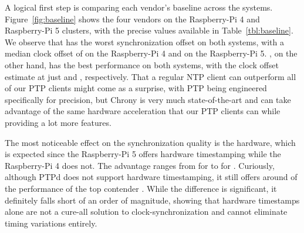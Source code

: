 


A logical first step is comparing each vendor's baseline across the systems. Figure~\ref{fig:baseline} shows the four vendors on the Raspberry-Pi 4 and Raspberry-Pi 5 clusters, with the precise values available in Table~\ref{tbl:baseline}. We observe that \fVendor{\cmpMaxArg} has the worst synchronization offset on both systems, with a median clock offset of \fTime[1]{\cmpMax} on the Raspberry-Pi 4 and  on the Raspberry-Pi 5.
\fVendor{\cmpMinArg}, on the other hand, has the best performance on both systems, with the clock offset estimate at just \fTime[1]{\cmpMin} and , respectively.
%
That a regular NTP client can outperform all of our PTP clients might come as a surprise, with PTP being engineered specifically for precision, but Chrony is very much state-of-the-art and can take advantage of the same hardware acceleration that our PTP clients can while providing a lot more features.


The most noticeable effect on the synchronization quality is the hardware, which is expected since the Raspberry-Pi 5 offers hardware timestamping while the Raspberry-Pi 4 does not. The advantage ranges from \fRatio{\cmpMin} for \fVendor{\cmpMinArg} to \fRatio{\cmpMax} for \fVendor{\cmpMaxArg}. Curiously, although PTPd does not support hardware timestamping, it still offers around  of the performance of the top contender . While the difference is significant, it definitely falls short of an order of magnitude, showing that hardware timestamps alone are not a cure-all solution to clock-synchronization and cannot eliminate timing variations entirely.


